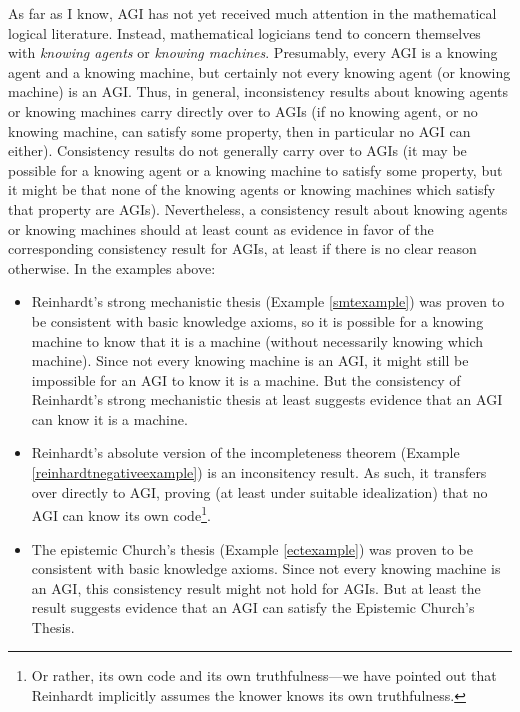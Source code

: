 \documentclass[runningheads]{llncs}
\begin{document}
\begin{remark}
  As far as I know, AGI has not yet received much attention in the mathematical logical
  literature. Instead, mathematical logicians tend to concern themselves with
  \emph{knowing agents} or \emph{knowing machines}. Presumably, every AGI is a
  knowing agent and a knowing machine, but certainly not every
  knowing agent (or knowing machine) is an AGI. Thus, in general,
  inconsistency results about knowing agents or knowing machines
  carry directly over to AGIs (if no knowing agent, or no knowing machine, can
  satisfy some property, then in particular no AGI can either).
  Consistency results do not generally carry over to AGIs (it may be possible for
  a knowing agent or a knowing machine to satisfy some property, but it might be
  that none of the knowing agents or knowing machines which satisfy that property
  are AGIs). Nevertheless, a consistency result about knowing agents or knowing machines
  should at least count as evidence in favor of the corresponding consistency result
  for AGIs, at least if there is no clear reason otherwise. In the examples above:
  \begin{itemize}
    \item
    Reinhardt's strong mechanistic thesis (Example \ref{smtexample})
    was proven to be consistent with basic knowledge axioms, so it is possible
    for a knowing machine to
    know that it is a machine (without necessarily knowing which machine).
    Since not every knowing machine is an AGI, it might still be impossible
    for an AGI to know it is a machine. But the consistency of Reinhardt's
    strong mechanistic thesis at least suggests evidence that an AGI can
    know it is a machine.
    \item
    Reinhardt's absolute version of the incompleteness theorem
    (Example \ref{reinhardtnegativeexample}) is an inconsitency result.
    As such, it transfers over directly to AGI, proving (at least under
    suitable idealization) that no AGI can know its own code\footnote{Or rather,
    its own code and its
    own truthfulness---we have pointed out \cite{alexander2014machine} that
    Reinhardt implicitly
    assumes the knower knows its own truthfulness.}.
    \item
    The epistemic Church's thesis (Example \ref{ectexample}) was proven to be
    consistent with basic knowledge axioms.
    Since not every knowing
    machine is an AGI, this consistency result might not hold for AGIs.
    But at least the result suggests evidence that
    an AGI can satisfy the Epistemic Church's Thesis.
  \end{itemize}
\end{remark}
\end{document}
